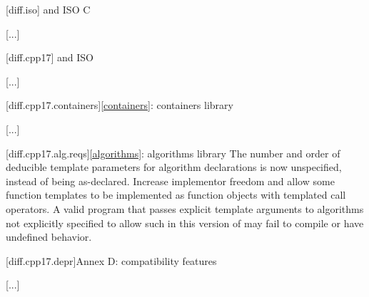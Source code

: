 \setcounter{chapter}{2}

[diff.iso]{\Cpp{} and ISO C}

[...]

\setcounter{section}{4}
[diff.cpp17]{\Cpp{} and ISO \CppXVII{}}

[...]

\setcounter{subsection}{7}
[diff.cpp17.containers]{\ref{containers}: containers library}

[...]

\begin{addedblock}
[diff.cpp17.alg.reqs]{\ref{algorithms}: algorithms library}
\change
The number and order of deducible template parameters for algorithm declarations
is now unspecified, instead of being as-declared.
\rationale Increase implementor freedom and allow some function templates
to be implemented as function objects with templated call operators.
\effect
A valid \CppXVII{} program that passes explicit template arguments to
algorithms not explicitly specified to allow such in this version of \Cpp{}
may fail to compile or have undefined behavior.
\end{addedblock}

[diff.cpp17.depr]{Annex D: compatibility features}

[...]

